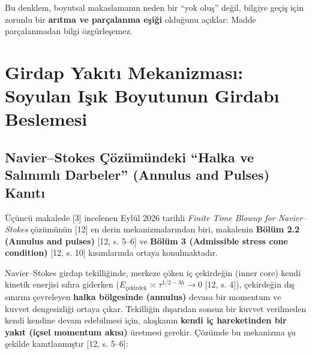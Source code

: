 \documentclass[12pt,a4paper]{article}
\begin{document}
Bu denklem, boyutsal makaslamanın neden bir ``yok oluş'' değil, bilgiye geçiş için zorunlu bir \textbf{arıtma ve parçalanma eşiği} olduğunu açıklar: Madde parçalanmadan bilgi özgürleşemez.

\section{Girdap Yakıtı Mekanizması: Soyulan Işık Boyutunun Girdabı Beslemesi}

\subsection{Navier--Stokes Çözümündeki ``Halka ve Salınımlı Darbeler'' (Annulus and Pulses) Kanıtı}

Üçüncü makalede [3] incelenen Eylül 2026 tarihli \textit{Finite Time Blowup for Navier--Stokes} çözümünün [12] en derin mekanizmalarından biri, makalenin \textbf{Bölüm 2.2 (Annulus and pulses)} [12, s. 5--6] ve \textbf{Bölüm 3 (Admissible stress cone condition)} [12, s. 10] kısımlarında ortaya konulmaktadır.

Navier--Stokes girdap tekilliğinde, merkeze çöken iç çekirdeğin (inner core) kendi kinetik enerjisi sıfıra giderken ($E_{\text{çekirdek}} \asymp \tau^{1/2-3h} \to 0$ [12, s. 4]), çekirdeğin dış sınırını çevreleyen \textbf{halka bölgesinde (annulus)} devasa bir momentum ve kuvvet dengesizliği ortaya çıkar. Tekilliğin dışarıdan sonsuz bir kuvvet verilmeden kendi kendine devam edebilmesi için, akışkanın \textbf{kendi iç hareketinden bir yakıt (içsel momentum akısı)} üretmesi gerekir. Çözümde bu mekanizma şu şekilde kanıtlanmıştır [12, s. 5--6]:
\end{document}
